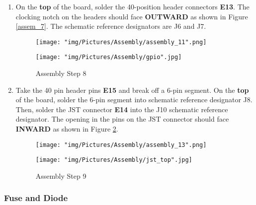\documentclass[12pt]{article}
\begin{document}
\begin{enumerate}

\item On the \textbf{top} of the board, solder the 40-position header connectors \textbf{E13}. The clocking notch on the headers should face \textbf{OUTWARD} as shown in Figure \ref{assem_7}. The schematic reference designators are J6 and J7.

\begin{figure}[H]
  \centering
  \begin{minipage}[b]{0.45\textwidth}
    \texttt{[image: "img/Pictures/Assembly/assembly\_11".png]}
  \end{minipage}
  \hfill
  \begin{minipage}[b]{0.45\textwidth}
    \texttt{[image: "img/Pictures/Assembly/gpio".jpg]}
  \end{minipage}
  \caption{Assembly Step 8}
  \label{assem_8}
\end{figure}


\item Take the 40 pin header pins \textbf{E15} and break off a 6-pin segment. On the \textbf{top} of the board, solder the 6-pin segment into schematic reference designator J8. Then, solder the JST connector \textbf{E14} into the J10 schematic reference designator. The opening in the pins on the JST connector should face \textbf{INWARD} as shown in Figure \ref{assem_9}.

\begin{figure}[H]
  \centering
  \begin{minipage}[b]{0.45\textwidth}
    \texttt{[image: "img/Pictures/Assembly/assembly\_13".png]}
  \end{minipage}
  \hfill
  \begin{minipage}[b]{0.45\textwidth}
    \texttt{[image: "img/Pictures/Assembly/jst\_top".jpg]}
  \end{minipage}
  \caption{Assembly Step 9}
  \label{assem_9}
\end{figure}


\end{enumerate}

\subsubsection{Fuse and Diode}
\end{document}
